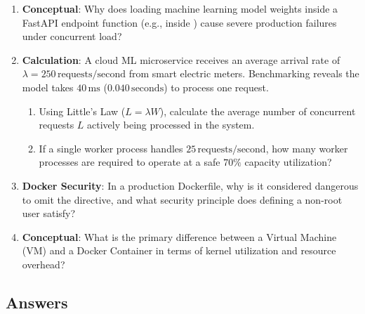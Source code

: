\begin{checkyourself}
\begin{enumerate}
    \item \textbf{Conceptual}: Why does loading machine learning model weights inside a FastAPI endpoint function (e.g., inside ) cause severe production failures under concurrent load?
    \item \textbf{Calculation}: A cloud ML microservice receives an average arrival rate of $\lambda = 250\,\text{requests/second}$ from smart electric meters. Benchmarking reveals the model takes $40\,\text{ms}$ ($0.040\,\text{seconds}$) to process one request.
    \begin{enumerate}
        \item Using Little's Law ($L = \lambda W$), calculate the average number of concurrent requests $L$ actively being processed in the system.
        \item If a single worker process handles $25\,\text{requests/second}$, how many worker processes are required to operate at a safe $70\%$ capacity utilization?
    \end{enumerate}
    \item \textbf{Docker Security}: In a production Dockerfile, why is it considered dangerous to omit the  directive, and what security principle does defining a non-root user satisfy?
    \item \textbf{Conceptual}: What is the primary difference between a Virtual Machine (VM) and a Docker Container in terms of kernel utilization and resource overhead?
\end{enumerate}
\end{checkyourself}

\subsection*{Answers}

